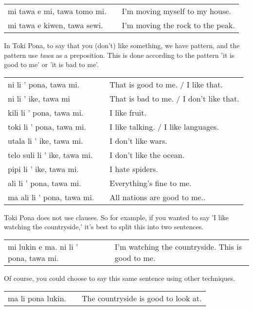 \begin{supertabular}{p{5,5cm}|ll}
    mi tawa e mi, tawa tomo mi. &  & I'm moving myself to my house.   \\
    mi tawa e kiwen, tawa sewi. &  & I'm moving the rock to the peak. \\
\end{supertabular}

In Toki Pona, to say that you (don't) like something, we have pattern, and the pattern use \textit{tawa} as a preposition.
This is done according to the pattern 'it is good to me' or 'it is bad to me'.

\begin{supertabular}{p{5,5cm}|ll}
    ni li ' pona, tawa mi.       &  & That is good to me. / I like that.      \\
    ni li ' ike, tawa mi         &  & That is bad to me. / I don't like that. \\
    kili li ' pona, tawa mi.     &  & I like fruit.                           \\
    toki li ' pona, tawa mi.     &  & I like talking. / I like languages.     \\
    utala li ' ike, tawa mi.     &  & I don't like wars.                      \\
    telo suli li ' ike, tawa mi. &  & I don't like the ocean.                 \\
    pipi li ' ike, tawa mi.      &  & I hate spiders.                         \\
    ali li ' pona, tawa mi.      &  & Everything's fine to me.                \\
    ma ali li ' pona, tawa mi.   &  & All nations are good to me..            \\
\end{supertabular}

Toki Pona does not use clauses.
So for example, if you wanted to say 'I like watching the countryside,' it's best to split this into two sentences.

\begin{supertabular}{p{5,5cm}|ll}
    mi lukin e ma. ni li ' pona, tawa mi. &  & I'm watching the countryside. This is good to me. \\
\end{supertabular}

Of course, you could choose to say this same sentence using other techniques.

\begin{supertabular}{p{5,5cm}|ll}
    ma li pona lukin. &  & The countryside is good to look at. \\
\end{supertabular}

